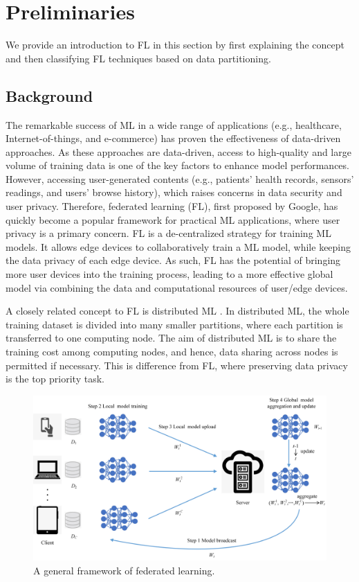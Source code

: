 \documentclass[10pt,journal,compsoc]{IEEEtran}
\begin{document}
\section{Preliminaries}
\label{sec:preliminaries}
We provide an introduction to FL in this section by first explaining the concept and then classifying FL techniques based on data partitioning.
\vspace{-0.2cm}
\subsection{Background}
The remarkable success of ML in a wide range of applications (e.g., healthcare, Internet-of-things, and e-commerce) has proven the effectiveness of data-driven approaches. As these approaches are data-driven, access to high-quality and large volume of training data is one of the key factors to enhance model performances. However, accessing user-generated contents (e.g., patients' health records, sensors' readings, and users' browse history), which raises concerns in data security and user privacy. Therefore, federated learning (FL), first proposed by Google, has quickly become a popular framework for practical ML applications, where user privacy is a primary concern. FL is a de-centralized strategy for training ML models. It allows edge devices to collaboratively train a ML model, while keeping the data privacy of each edge device. As such, FL has the potential of bringing more user devices into the training process, leading to a more effective global model via combining the data and computational resources of user/edge devices.

A closely related concept to FL is distributed ML \cite{kim2016deepspark} \cite{sergeev2018horovod}. In distributed ML, the whole training dataset is divided into many smaller partitions, where each partition is transferred to one computing node. The aim of distributed ML is to share the training cost among computing nodes, and hence, data sharing across nodes is permitted if necessary. This is difference from FL, where preserving data privacy is the top priority task.

\begin{figure}[!t]
	\centering
	\setlength{\abovecaptionskip}{-0.3cm}
	\includegraphics[scale=0.65]{FrameworkofFL.png}
	\caption{A general framework of federated learning. }
	\label{Framework of FL}
\end{figure}
\end{document}
